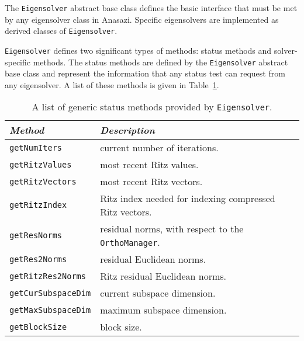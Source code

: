 \documentclass[acmtoms]{acmtrans2m}
\newcommand{\aspace}[1]{\texttt{#1}}
\begin{document}

The \aspace{Eigensolver} abstract base class defines the basic interface that must be met
by any eigensolver class in Anasazi. Specific eigensolvers are implemented as derived
classes of \aspace{Eigensolver}.

\aspace{Eigensolver} defines two significant types of methods: status methods and
solver-specific methods. The status methods are defined by the \aspace{Eigensolver}
abstract base class and represent the information that any status test can request from
any eigensolver. A list of these methods is given in
Table~\ref{tab:anasazi:genstatusmethods}.


\begin{table}[htp]
\begin{center}
\caption{A list of generic status methods provided by
\aspace{Eigensolver}.} \label{tab:anasazi:genstatusmethods}
\begin{tabular}{| p{3cm} | p{6cm} |}
\hline
\emph{Method} & \emph{Description} \\
\hline
{\tt getNumIters}       & current number of iterations. \\
{\tt getRitzValues}     & most recent Ritz values. \\
{\tt getRitzVectors}    & most recent Ritz vectors. \\
{\tt getRitzIndex}      & Ritz index needed for indexing compressed Ritz vectors. \\
{\tt getResNorms}       & residual norms, with respect to the \aspace{OrthoManager}. \\
{\tt getRes2Norms}      & residual Euclidean norms. \\
{\tt getRitzRes2Norms}  & Ritz residual  Euclidean norms. \\
{\tt getCurSubspaceDim} & current subspace dimension. \\
{\tt getMaxSubspaceDim} & maximum subspace dimension. \\
{\tt getBlockSize}      & block size. \\
\hline
\end{tabular}
\end{center}
\end{table}
\end{document}
